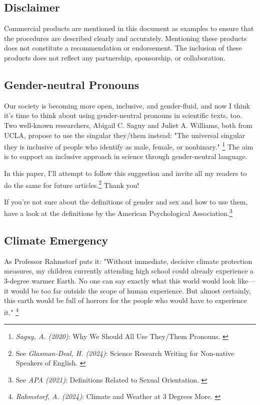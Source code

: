 \subsection{Disclaimer}

Commercial products are mentioned in this document as examples to ensure that the procedures are described clearly and accurately. Mentioning these products does not constitute a recommendation or endorsement. The inclusion of these products does not reflect any partnership, sponsorship, or collaboration.

\subsection{Gender-neutral Pronouns}

Our society is becoming more open, inclusive, and gender-fluid, and now I think it's time to think about using gender-neutral pronouns in scientific texts, too. Two well-known researchers, Abigail C. Saguy and Juliet A. Williams, both from UCLA, propose to use the singular they/them instead: "The universal singular they is inclusive of people who identify as male, female, or nonbinary." \footnote{\textit{Saguy, A. (2020)}: Why We Should All Use They/Them Pronouns. \cite{pronouns}} The aim is to support an inclusive approach in science through gender-neutral language. 

In this paper, I'll attempt to follow this suggestion and invite all my readers to do the same for future articles.\footnote {See \textit{Glasman-Deal, H. (2024)}: Science Research Writing for Non-native Speakers of English. \cite{Glasman-Deal2010}} Thank you!

If you're not sure about the definitions of gender and sex and how to use them, have a look at the definitions by the American Psychological Association.\footnote{See \textit{APA (2021)}: Definitions Related to Sexual Orientation. \cite{apaDefinitions}}

\subsection{Climate Emergency}

As Professor Rahmstorf puts it: "Without immediate, decisive climate protection measures, my children currently attending high school could already experience a 3-degree warmer Earth. No one can say exactly what this world would look like—it would be too far outside the scope of human experience. But almost certainly, this earth would be full of horrors for the people who would have to experience it." \footnote{\textit{Rahmstorf, A. (2024)}: Climate and Weather at 3 Degrees More. \cite{3dgreesMore}}
